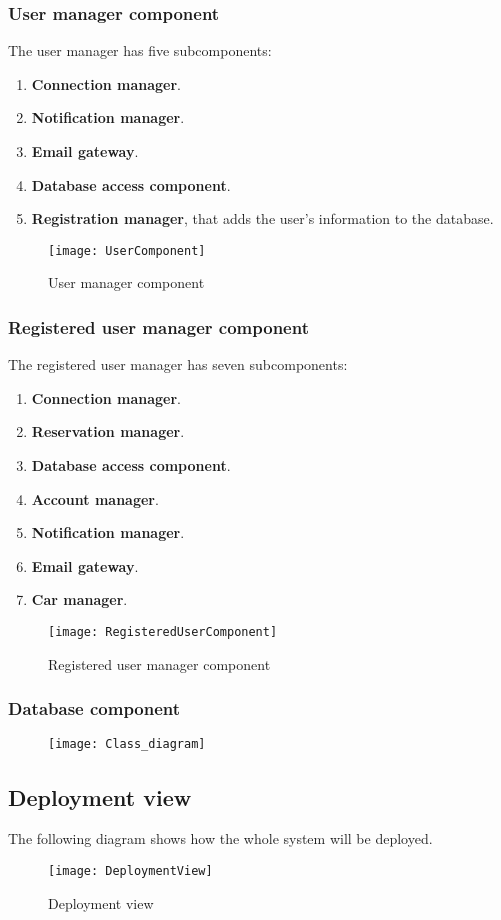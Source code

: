 \subsubsection{User manager component}
The user manager has five subcomponents:
\begin{enumerate}
	\item \textbf{Connection manager}.
	\item \textbf{Notification manager}.
	\item \textbf{Email gateway}.
	\item \textbf{Database access component}.
		\item \textbf{Registration manager}, that adds the user's information to the database.
\end{enumerate}
\begin{figure}[H]
	\centering
	\texttt{[image: UserComponent]}
	\caption{User manager component}
\end{figure}
\newpage
\subsubsection{Registered user manager component}
The registered user manager has seven subcomponents:
\begin{enumerate}
	\item \textbf{Connection manager}.
	\item \textbf{Reservation manager}.
	\item \textbf{Database access component}.
	\item \textbf{Account manager}.
	\item \textbf{Notification manager}.
	\item \textbf{Email gateway}.
	\item \textbf{Car manager}.
\end{enumerate}
\begin{figure}[H]
	\centering
	\texttt{[image: RegisteredUserComponent]}
	\caption{Registered user manager component}
\end{figure}
\subsubsection{Database component}
\begin{figure}[H]
	\centering
	\texttt{[image: Class\_diagram]}
\end{figure}
\subsection{Deployment view} 
The following diagram shows how the whole system will be deployed.
\begin{figure}[H]
	\centering
	\texttt{[image: DeploymentView]}
	\caption{Deployment view}
\end{figure} 
\newpage
